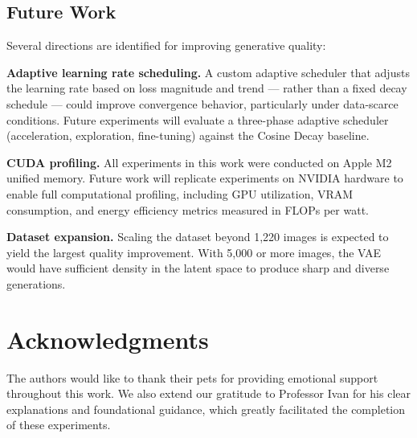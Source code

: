 \documentclass[11pt,a4paper]{article}
\begin{document}
\subsection{Future Work}

Several directions are identified for improving generative quality:

\textbf{Adaptive learning rate scheduling.} A custom adaptive scheduler that adjusts the learning rate based on loss magnitude and trend — rather than a fixed decay schedule — could improve convergence behavior, particularly under data-scarce conditions. Future experiments will evaluate a three-phase adaptive scheduler (acceleration, exploration, fine-tuning) against the Cosine Decay baseline.

\textbf{CUDA profiling.} All experiments in this work were conducted on Apple M2 unified memory. Future work will replicate experiments on NVIDIA hardware to enable full computational profiling, including GPU utilization, VRAM consumption, and energy efficiency metrics measured in FLOPs per watt.

\textbf{Dataset expansion.} Scaling the dataset beyond 1{,}220 images is expected to yield the largest quality improvement. With 5{,}000 or more images, the VAE would have sufficient density in the latent space to produce sharp and diverse generations.


\section*{Acknowledgments}

The authors would like to thank their pets for providing emotional support throughout this work. We also extend our gratitude to Professor Ivan for his clear explanations and foundational guidance, which greatly facilitated the completion of these experiments.

\end{document}
